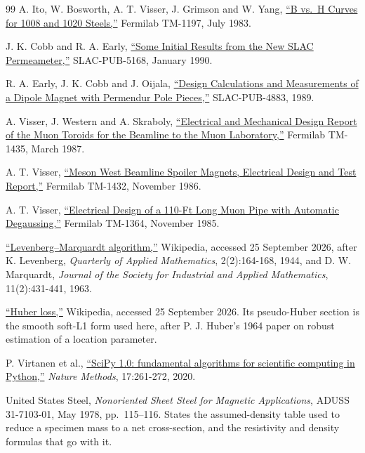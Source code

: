 \documentclass[
  11pt,
]{article}
\begin{document}
\begin{thebibliography}{99}
 A. Ito, W. Bosworth, A. T. Visser, J. Grimson and W. Yang, \href{https://lss.fnal.gov/archive/test-tm/1000/fermilab-tm-1197.pdf}{``B vs.~H Curves for 1008 and 1020 Steels,''} Fermilab TM-1197, July 1983.

 J. K. Cobb and R. A. Early, \href{https://www.slac.stanford.edu/pubs/slacpubs/5000/slac-pub-5168.pdf}{``Some Initial Results from the New SLAC Permeameter,''} SLAC-PUB-5168, January 1990.

 R. A. Early, J. K. Cobb and J. Oijala, \href{https://www.slac.stanford.edu/pubs/slacpubs/4750/slac-pub-4883.pdf}{``Design Calculations and Measurements of a Dipole Magnet with Permendur Pole Pieces,''} SLAC-PUB-4883, 1989.

 A. Visser, J. Western and A. Skraboly, \href{https://lss.fnal.gov/archive/test-tm/1000/fermilab-tm-1435.pdf}{``Electrical and Mechanical Design Report of the Muon Toroids for the Beamline to the Muon Laboratory,''} Fermilab TM-1435, March 1987.

 A. T. Visser, \href{https://lss.fnal.gov/archive/test-tm/1000/fermilab-tm-1432.pdf}{``Meson West Beamline Spoiler Magnets, Electrical Design and Test Report,''} Fermilab TM-1432, November 1986.

 A. T. Visser, \href{https://lss.fnal.gov/archive/test-tm/1000/fermilab-tm-1364.pdf}{``Electrical Design of a 110-Ft Long Muon Pipe with Automatic Degaussing,''} Fermilab TM-1364, November 1985.


 \href{https://en.wikipedia.org/wiki/Levenberg-Marquardt_algorithm}{``Levenberg--Marquardt algorithm,''} Wikipedia, accessed 25 September 2026, after K. Levenberg, \emph{Quarterly of Applied Mathematics}, 2(2):164-168, 1944, and D. W. Marquardt, \emph{Journal of the Society for Industrial and Applied Mathematics}, 11(2):431-441, 1963.

 \href{https://en.wikipedia.org/wiki/Huber_loss}{``Huber loss,''} Wikipedia, accessed 25 September 2026. Its pseudo-Huber section is the smooth soft-L1 form used here, after P. J. Huber's 1964 paper on robust estimation of a location parameter.

 P. Virtanen et al., \href{https://doi.org/10.1038/s41592-019-0686-2}{``SciPy 1.0: fundamental algorithms for scientific computing in Python,''} \emph{Nature Methods}, 17:261-272, 2020.

 United States Steel, \emph{Nonoriented Sheet Steel for Magnetic Applications}, ADUSS 31-7103-01, May 1978, pp.~115--116. States the assumed-density table used to reduce a specimen mass to a net cross-section, and the resistivity and density formulas that go with it.


\end{thebibliography}
\end{document}
